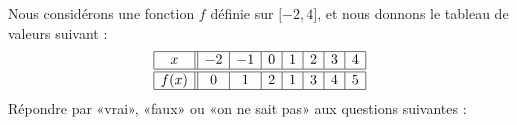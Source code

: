 
\begin{exercice}\label{exosmath-0489}

    Nous considérons une fonction \( f\) définie sur \( \mathopen[ -2 , 4 \mathclose]\), et nous donnons le tableau de valeurs suivant :
    \begin{equation*}
        \begin{array}[]{|c||c|c|c|c|c|c|c|}
            \hline
            x&-2&-1&0&1&2&3&4\\
            \hline\hline
            f(x)&0&1&2&1&3&4&5\\
            \hline
        \end{array}
    \end{equation*}
    Répondre par «vrai», «faux» ou «on ne sait pas» aux questions suivantes :

\end{exercice}
